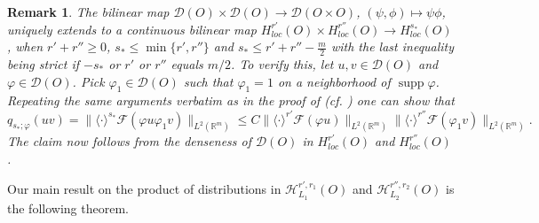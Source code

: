 \documentclass{amsart}
\newtheorem{remark}{Remark}[section]
\newcommand{\supp}{\operatorname{supp}}
\theoremstyle{definition}
\begin{document}
\begin{remark}\label{rtksloh-kfvss}
The bilinear map $\mathcal{D}(O)\times \mathcal{D}(O)\rightarrow \mathcal{D}(O\times O)$, $(\psi,\phi)\mapsto \psi\phi$, uniquely extends to a continuous bilinear map $H_{loc} ^{r'} (O)\times H_{loc} ^{r''} (O)\rightarrow H_{loc} ^{s_*} (O)$, when $r'+r''\geq0$, $s_*\leq \min\{r',r''\}$ and $s_*\leq r'+r''-\frac{m}{2}$ with the last inequality being strict if $-s_*$ or $r'$ or $r''$ equals $m/2$. To verify this, let $u,v\in\mathcal{D}(O)$ and $\varphi\in\mathcal{D}(O)$. Pick $\varphi_1\in\mathcal{D}(O)$ such that $\varphi_1=1$ on a neighborhood of $\supp\varphi$. Repeating the same arguments verbatim as in the proof of \cite[Theorem 8.3.1, p. 189]{HNonlinear} (cf. \cite{beh-h,TJPT}) one can show that
\begin{equation*}
q_{s_*;\varphi}(uv)=\|\langle\cdot\rangle^{s_*}\mathcal{F}(\varphi u \varphi_1 v)\|_{L^2(\mathbb{R}^m)}\leq C \|\langle\cdot\rangle^{r'}\mathcal{F}(\varphi u)\|_{L^2(\mathbb{R}^m)} \|\langle\cdot\rangle^{r''}\mathcal{F}(\varphi_1 v)\|_{L^2(\mathbb{R}^m)}.
\end{equation*}
The claim now follows from the denseness of $\mathcal{D}(O)$ in $H_{loc} ^{r'} (O)$ and $H_{loc} ^{r''} (O)$.
\end{remark}

Our main result on the product of distributions in $\mathscr{H}_{L_1} ^{r',r_1} (O)$ and $\mathscr{H}_{L_2} ^{r'',r_2} (O)$ is the following theorem.
\end{document}
